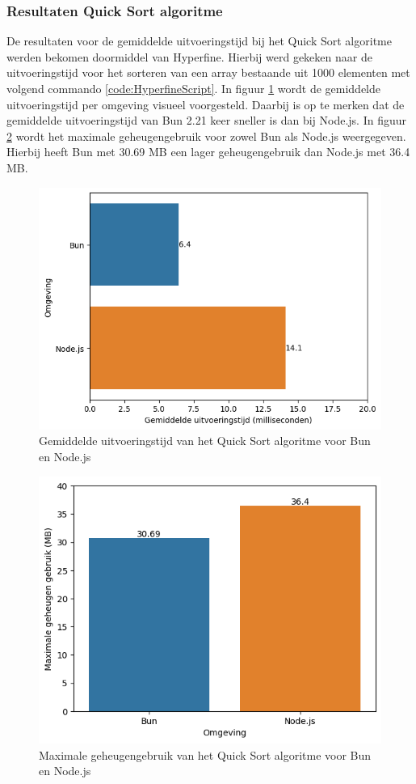 \subsubsection{Resultaten  Quick Sort algoritme}
De resultaten voor de gemiddelde uitvoeringstijd bij het Quick Sort algoritme werden bekomen doormiddel van Hyperfine.
Hierbij werd gekeken naar de uitvoeringstijd voor het sorteren van een array bestaande uit 1000 elementen met volgend commando \ref{code:HyperfineScript}.
In figuur \ref{fig:uitvoeringstijdscript} wordt de gemiddelde uitvoeringstijd per omgeving visueel voorgesteld. 
Daarbij is op te merken dat de gemiddelde uitvoeringstijd van Bun 2.21 keer sneller is dan bij Node.js.
In figuur \ref{fig:RAMscript} wordt het maximale geheugengebruik voor zowel Bun als Node.js weergegeven. Hierbij heeft Bun met 30.69 MB een lager geheugengebruik dan Node.js met 36.4 MB.
\begin{figure}[H]
  \centering
  \includegraphics{graphics/scriptuitvoeringstijd.png}
  \caption{\label{fig:uitvoeringstijdscript}Gemiddelde uitvoeringstijd van het Quick Sort algoritme voor Bun en Node.js}
\end{figure}

\begin{figure}[H]
  \centering
  \includegraphics{graphics/RAMScript.png}
  \caption{\label{fig:RAMscript}Maximale geheugengebruik van het Quick Sort algoritme voor Bun en Node.js}
\end{figure}

